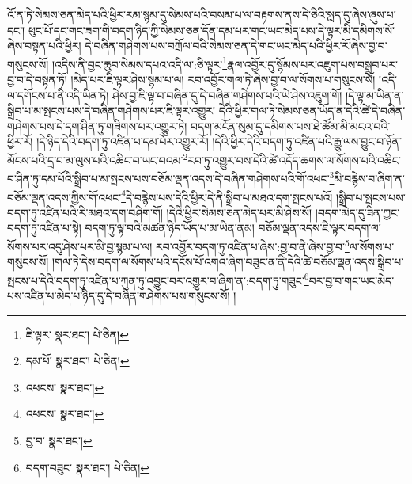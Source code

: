 འོ་ན་ཏེ་སེམས་ཅན་མེད་པའི་ཕྱིར་རམ་སྙམ་དུ་སེམས་པའི་བསམ་པ་ལ་བརྟགས་ནས་དེ་ཅིའི་སླད་དུ་ཞེས་ཞུས་པ་དང་། ཕུང་པོ་དང་གང་ཟག་གི་བདག་ཉིད་ཀྱི་སེམས་ཅན་དོན་དམ་པར་གང་ཡང་མེད་པས་དེ་ལྟར་མི་དམིགས་སོ་ཞེས་བསྟན་པའི་ཕྱིར། དེ་བཞིན་གཤེགས་པས་བཀྲོལ་བའི་སེམས་ཅན་དེ་གང་ཡང་མེད་པའི་ཕྱིར་རོ་ཞེས་བྱ་བ་གསུངས་སོ། །འདིས་ནི་བྱང་ཆུབ་སེམས་དཔའ་འདི་ལ་:ཅི་ལྟར་\footnote{ཇི་ལྟར་  སྣར་ཐང་།  པེ་ཅིན། }རྣལ་འབྱོར་དུ་སྙོམས་པར་འཇུག་པས་བསྒྲུབ་པར་བྱ་བ་དེ་བསྟན་ཏོ། །མེད་པར་ཇི་ལྟར་ཤེས་སྙམ་པ་ལ། རབ་འབྱོར་གལ་ཏེ་ཞེས་བྱ་བ་ལ་སོགས་པ་གསུངས་སོ། །འདི་ལ་དགོངས་པ་ནི་འདི་ཡིན་ཏེ། ཤེས་བྱ་ཇི་ལྟ་བ་བཞིན་དུ་དེ་བཞིན་གཤེགས་པའི་ཡེ་ཤེས་འཇུག་གོ། །དེ་ལྟ་མ་ཡིན་ན་སྒྲིབ་པ་མ་སྤངས་པས་དེ་བཞིན་གཤེགས་པར་ཇི་ལྟར་འགྱུར། དེའི་ཕྱིར་གལ་ཏེ་སེམས་ཅན་ཡོད་ན་དེའི་ཚེ་དེ་བཞིན་གཤེགས་པས་དེ་དག་ཤིན་ཏུ་གཟིགས་པར་འགྱུར་ཏེ། བདག་མངོན་སུམ་དུ་དམིགས་པས་ཐེ་ཚོམ་མི་མངའ་བའི་ཕྱིར་རོ། །དེ་ཉིད་དེའི་བདག་ཏུ་འཛིན་པ་དམ་པོར་འགྱུར་རོ། །དེའི་ཕྱིར་དེའི་བདག་ཏུ་འཛིན་པའི་རྒྱུ་ལས་བྱུང་བ་ཉོན་མོངས་པའི་དྲ་བ་མ་ལུས་པའི་འཆིང་བ་ཡང་བའམ་\footnote{དམ་པོ་  སྣར་ཐང་།  པེ་ཅིན། }རབ་ཏུ་འགྱུར་བས་དེའི་ཚེ་འདོད་ཆགས་ལ་སོགས་པའི་འཆིང་བ་ཤིན་ཏུ་དམ་པོའི་སྒྲིབ་པ་མ་སྤངས་པས་བཅོམ་ལྡན་འདས་དེ་བཞིན་གཤེགས་པའི་གོ་འཕང་\footnote{འཕངས་  སྣར་ཐང་། }མི་བརྙེས་བ་ཞིག་ན་བཅོམ་ལྡན་འདས་ཀྱིས་གོ་འཕང་\footnote{འཕངས་  སྣར་ཐང་། }དེ་བརྙེས་པས་དེའི་ཕྱིར་དེ་ནི་སྒྲིབ་པ་མཐའ་དག་སྤངས་པའོ། །སྒྲིབ་པ་སྤངས་པས་བདག་ཏུ་འཛིན་པའི་རི་མཐའ་དག་བཤིག་གོ། །དེའི་ཕྱིར་སེམས་ཅན་མེད་པར་མི་ཤེས་སོ། །བདག་མེད་དུ་ཟིན་ཀྱང་བདག་ཏུ་འཛིན་པ་སྟེ། བདག་ཏུ་ལྟ་བའི་མཚན་ཉིད་ཡོད་པ་མ་ཡིན་ནམ། བཅོམ་ལྡན་འདས་ཇི་ལྟར་བདག་ལ་སོགས་པར་འདུ་ཤེས་པར་མི་བྱ་སྙམ་པ་ལ། རབ་འབྱོར་བདག་ཏུ་འཛིན་པ་ཞེས་:བྱ་བ་ནི་ཞེས་བྱ་བ་\footnote{བྱ་བ་  སྣར་ཐང་། }ལ་སོགས་པ་གསུངས་སོ། །གལ་ཏེ་དེས་བདག་ལ་སོགས་པའི་དངོས་པོ་འགའ་ཞིག་བཟུང་ན་ནི་དེའི་ཚེ་བཅོམ་ལྡན་འདས་སྒྲིབ་པ་སྤངས་པ་དེའི་བདག་ཏུ་འཛིན་པ་ཀུན་ཏུ་འབྱུང་བར་འགྱུར་བ་ཞིག་ན་:བདག་ཏུ་གཟུང་\footnote{བདག་བཟུང་  སྣར་ཐང་།  པེ་ཅིན། }བར་བྱ་བ་གང་ཡང་མེད་པས་འཛིན་པ་མེད་པ་ཉིད་དུ་དེ་བཞིན་གཤེགས་པས་གསུངས་སོ། །
